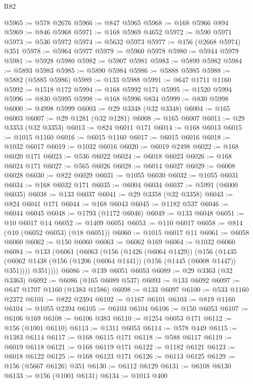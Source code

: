 \begin{lexlean}{R82}
\begin{coremodule}
@5965 := @578 @2676
@5966 := @847 @5965
@5968 := @168 @5966 @894
@5969 := @846 @5968
@5971 := @168 @5969 @4652
@5972 := @590 @5971
@5973 := @536 @5972
@5974 := @5632 @5973
@5977 := @156 (@2668 @5974) @351
@5978 := @5964 @5977
@5979 := @5960 @5978
@5980 := @5944 @5979
@5981 := @5928 @5980
@5982 := @5907 @5981
@5983 := @5899 @5982
@5984 := @5893 @5983
@5985 := @5890 @5984
@5986 := @5888 @5985
@5988 := @5882 (@5885 @5986)
@5989 := @133 @5988
@5991 := @647 @1711 @1160
@5992 := @1518 @172
@5994 := @168 @5992 @171
@5995 := @1520 @5994
@5996 := @830 @5995
@5998 := @168 @5996 @834
@5999 := @830 @5998
@6000 := @4998 @5999
@6003 := @29 @3348 (@32 @3348)
@6004 := @165 @6003
@6007 := @29 @1281 (@32 @1281)
@6008 := @165 @6007
@6011 := @29 @3353 (@32 @3353)
@6013 := @824 @6011 @171
@6014 := @168 @6013
@6015 := @1015 @1160
@6016 := @6015 @1160
@6017 := @6015 @6016
@6018 := @1032 @6017
@6019 := @1032 @6016
@6020 := @6019 @2498
@6022 := @168 @6020 @171
@6023 := @536 @6022
@6024 := @6018 @6023
@6026 := @168 @6024 @171
@6027 := @565 @6026
@6028 := @6014 @6027
@6029 := @6008 @6028
@6030 := @822 @6029
@6031 := @1055 @6030
@6032 := @1055 @6031
@6034 := @168 @6032 @171
@6035 := @6004 @6034
@6037 := @5991 (@6000 @6035)
@6038 := @133 @6037
@6041 := @29 @3358 (@32 @3358)
@6043 := @824 @6041 @171
@6044 := @168 @6043
@6045 := @1182 @537
@6046 := @6044 @6045
@6048 := @1793 (@1172 @6046)
@6049 := @133 @6048
@6051 := @10 @6017 @14
@6052 := @1409 @6051
@6053 := @110 @6017
@6058 := @814 (@10 (@6052 @6053) (@18 @6051))
@6060 := @1015 @6017 @11
@6061 := @6058 @6060
@6062 := @150 @6060
@6063 := @6062 @169
@6064 := @1032 @6060
@6084 := @133
    (@6061
      (@6063
        (@156
          (@1426 (@6064 @1429))
          (@156
            (@1435 (@6062 @1438 (@156 (@1206 (@6064 @1441)) (@156 (@1445 (@6008 @1447)) @351))))
            @351))))
@6086 := @139 @6051 @6053
@6089 := @29 @3363 (@32 @3363)
@6092 := @6086 (@165 @6089 @537)
@6093 := @133 @6092
@6097 := @647 @1707 @1160 (@1383 @1586)
@6098 := @133 @6097
@6100 := @533 @1160 @2372
@6101 := @822 @2394
@6102 := @1167 @6101
@6103 := @819 @1160
@6104 := @1055 @2394
@6105 := @6103 @6104
@6106 := @150 @6053
@6107 := @6106 @169
@6108 := @6106 @383
@6110 := @1254 @6053 @171
@6112 := @156 (@1001 @6110)
@6113 := @1311 @6053
@6114 := @578 @449
@6115 := @1383 @6114
@6117 := @168 @6115 @171
@6118 := @588 @6117
@6119 := @6019 @6118
@6121 := @168 @6119 @171
@6122 := @1182 @6121
@6123 := @6018 @6122
@6125 := @168 @6123 @171
@6126 := @6113 @6125
@6129 := @156 (@5667 @6126) @351
@6130 := @6112 @6129
@6131 := @6108 @6130
@6133 := @156 (@1001 @6131)
@6134 := @1013 @400

\end{coremodule}
\end{lexlean}
